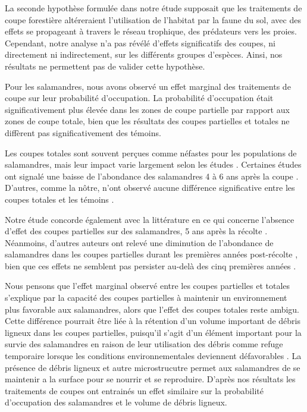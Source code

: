 
La seconde hypothèse formulée dans notre étude supposait que les traitements de coupe forestière altéreraient l'utilisation de l'habitat par la faune du sol, avec des effets se propageant à 
travers le réseau trophique, des prédateurs vers les proies. 
Cependant, notre analyse n'a pas révélé d'effets significatifs des coupes, ni directement ni indirectement, sur les différents groupes d'espèces. 
Ainsi, nos résultats ne permettent pas de valider cette hypothèse.

Pour les salamandres, nous avons observé un effet marginal des traitements de coupe sur leur probabilité d'occupation. 
La probabilité d'occupation était significativement plus élevée dans les zones de coupe partielle par rapport aux zones de coupe totale, 
bien que les résultats des coupes partielles et totales ne diffèrent pas significativement des témoins.

Les coupes totales sont souvent perçues comme néfastes pour les populations de salamandres, mais leur impact varie largement selon les études \citep{Hocking2013Effectsexperimental,Chaudhary2016Impactforest}. 
Certaines études ont signalé une baisse de l'abondance des salamandres 4 à 6 ans après la coupe \citep{Petranka1993Effectstimber,Herbeck1999PlethodontidSalamander,Grialou2000effectsforest,Macneil2014Effectstimber}. 
D'autres, comme la nôtre, n'ont observé aucune différence significative entre les coupes totales et les témoins \citep{Renken2004EffectsForest,Mazerolle2021Woodlandsalamander}. 

Notre étude concorde également avec la littérature en ce qui concerne l'absence d'effet des coupes partielles sur des salamandres, 5 ans après la récolte \citep{McKenny2006Effectsstructural,Mazerolle2021Woodlandsalamander,Ochs2022Responseterrestrial}. 
Néanmoins, d'autres auteurs ont relevé une diminution de l'abondance de salamandres dans les coupes partielles durant les premières années post-récolte \citep{Harpole1999Effectsseven,Knapp2003Initialeffects,Morneault2004effectshelterwood}, 
bien que ces effets ne semblent pas persister au-delà des cinq premières années \citep{Morneault2004effectshelterwood}.

Nous pensons que l'effet marginal observé entre les coupes partielles et totales s'explique par la capacité des coupes partielles à maintenir un environnement plus favorable aux salamandres, 
alors que l'effet des coupes totales reste ambigu. 
Cette différence pourrait être liée à la rétention d'un volume important de débris ligneux dans les coupes partielles, 
puisqu'il s'agit d'un élément important pour la survie des salamandres en raison de leur utilisation des débris comme refuge temporaire lorsque les conditions environnementales deviennent défavorables \citep{Nolet2018Comparingeffects,Peterman2014Spatialvariation,Achat2015Quantifyingconsequences,Peele2017Effectswoody}.
La présence de débris ligneux et autre microstrucutre permet aux salamandres de se maintenir a la surface pour se nourrir et se reproduire. 
D'après nos résultats les traitements de coupes ont entrainés un effet similaire sur la probabilité d'occupation des salamandres et le volume de débris ligneux.

